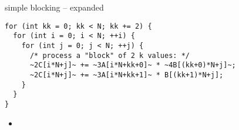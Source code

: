 \begin{frame}[fragile,label=cacheBlockKExpand]{simple blocking -- expanded}
\begin{lstlisting}
for (int kk = 0; kk < N; kk += 2) {
  for (int i = 0; i < N; ++i) {
    for (int j = 0; j < N; ++j) {
      /* process a "block" of 2 k values: */
      ~2C[i*N+j]~ += ~3A[i*N+kk+0]~ * ~4B[(kk+0)*N+j]~;
      ~2C[i*N+j]~ += ~3A[i*N+kk+1]~ * B[(kk+1)*N+j];
    }
  }
}
\end{lstlisting}
\begin{itemize}
\item {}
\end{itemize}
\end{frame}

